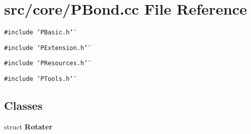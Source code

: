 \section{src/core/PBond.cc File Reference}
\label{PBond_8cc}


{\tt \#include \char`\"{}PBasic.h\char`\"{}}\par
{\tt \#include \char`\"{}PExtension.h\char`\"{}}\par
{\tt \#include \char`\"{}PResources.h\char`\"{}}\par
{\tt \#include \char`\"{}PTools.h\char`\"{}}\par
\subsection*{Classes}
\begin{CompactItemize}
\item 
struct {\bf Rotater}
\end{CompactItemize}

